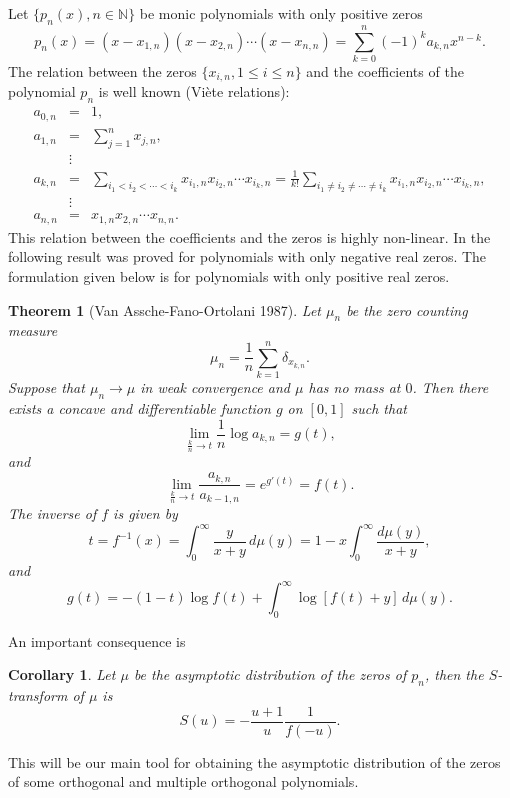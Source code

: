 \documentclass[12pt]{article}
\newtheorem{theorem}{Theorem}
\newtheorem{corollary}{Corollary}
\numberwithin{equation}{section}
\begin{document}
Let $\{ p_n(x), n \in \mathbb{N}\}$ be monic polynomials with only positive zeros
\[   p_n(x) = (x-x_{1,n})(x-x_{2,n}) \cdots (x-x_{n,n}) = \sum_{k=0}^n (-1)^k a_{k,n}  x^{n-k}. \]
The relation between the zeros $\{x_{i,n}, 1 \leq i \leq n\}$ and the coefficients of the polynomial $p_n$ is well known (Vi\`ete relations):
\begin{eqnarray*}   
                       a_{0,n} &=& 1, \\
                       a_{1,n} &=&  \sum_{j=1}^n x_{j,n}, \\[-10pt]
                       &\vdots & \\[-2pt]
                       a_{k,n} & = & \sum_{i_1 < i_2 < \cdots < i_k} x_{i_1,n}x_{i_2,n}\cdots x_{i_k,n}   
                                    =\frac{1}{k!} \sum_{i_1\neq i_2 \neq \cdots \neq i_k}  x_{i_1,n}x_{i_2,n}\cdots x_{i_k,n},   \\[-10pt]  
                                    & \vdots & \\[-2pt]
                       a_{n,n} &=& x_{1,n}x_{2,n} \cdots x_{n,n}.
\end{eqnarray*}
This relation between the coefficients and the zeros  is highly non-linear. In \cite{WVAFO} the following result was proved for polynomials with only negative real zeros.
The formulation given below is for polynomials with only positive real zeros. \newpage

                                   
\begin{theorem}[Van Assche-Fano-Ortolani 1987]  \label{thm:main}
Let $\mu_n$ be the zero counting measure
\[   \mu_n = \frac{1}{n}  \sum_{k=1}^n \delta_{x_{k,n}}. \]
Suppose that $\mu_n \to \mu$ in weak convergence and $\mu$ has no mass at $0$. Then there exists a concave and
differentiable function $g$ on $[0,1]$ such that
\begin{equation}  \label{lim-g}
      \lim_{\frac{k}{n} \to t} \frac1n \log a_{k,n} = g(t), 
\end{equation}
and
\begin{equation}    \label{lim-f}
    \lim_{\frac{k}{n} \to t} \frac{a_{k,n}}{a_{k-1,n}} = e^{g'(t)} = f(t).  
\end{equation}
The inverse of $f$ is given by
\[   t = f^{-1}(x) = \int_0^\infty \frac{y}{x+y}\, d\mu(y) = 1 - x \int_0^\infty \frac{d\mu(y)}{x+y},  \]
and
\[   g(t) = -(1-t) \log f(t) + \int_0^\infty \log[f(t)+y]\, d\mu(y).  \]
\end{theorem}

An important consequence is
\begin{corollary}  \label{cor:S}
Let $\mu$ be the asymptotic distribution of the zeros of $p_n$, then
 the $S$-transform of $\mu$ is
\[    S(u) = -\frac{u+1}{u} \frac{1}{f(-u)}.   \]
\end{corollary}
This will be our main tool for obtaining the asymptotic distribution of the zeros of some orthogonal and multiple orthogonal polynomials.
\end{document}

